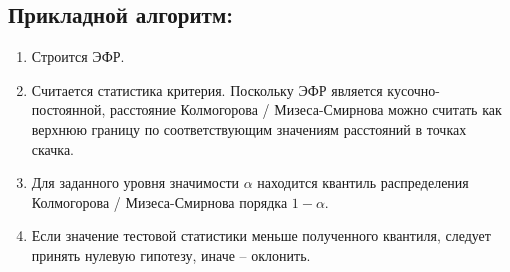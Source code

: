 \pagebreak

\subsection{Прикладной алгоритм:}
\begin{enumerate}
  \item Строится ЭФР.
  \item Считается статистика критерия. Поскольку ЭФР является
  кусочно-постоянной, расстояние Колмогорова / Мизеса-Смирнова можно считать как
  верхнюю границу по соответствующим значениям расстояний в точках скачка.
  \item Для заданного уровня значимости $\alpha$ находится квантиль
  распределения Колмогорова / Мизеса-Смирнова порядка $1 - \alpha$.
  \item Если значение тестовой статистики меньше полученного квантиля,
  следует принять нулевую гипотезу, иначе -- оклонить.
\end{enumerate}
